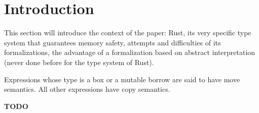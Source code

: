 \section{Introduction}\label{sec:introduction}

This section will introduce the context of the paper: Rust, its very
specific type system that guarantees memory safety, attempts and difficulties
of its formalizations, the advantage of a formalization based on abstract
interpretation (never done before for the type system of Rust).

Expressions whose type is a box or a mutable borrow are said to have move semantics.
All other expressions have copy semantics.

\textbf{TODO}
